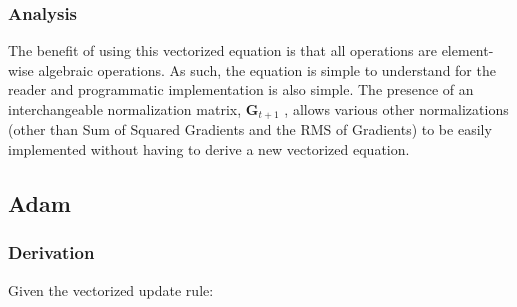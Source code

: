 \documentclass{article}
\begin{document}
\subsubsection{Analysis}
The benefit of using this vectorized equation is that all operations are element-wise algebraic operations. As such, the equation is simple to understand for the reader and programmatic implementation is also simple. The presence of an interchangeable normalization matrix, $\boldsymbol{G}_{t+1}$ , allows various other normalizations (other than Sum of Squared Gradients and the RMS of Gradients) to be easily implemented without having to derive a new vectorized equation. 

\subsection{Adam}
\subsubsection{Derivation}

Given the vectorized update rule: \hfill\newline
\end{document}
